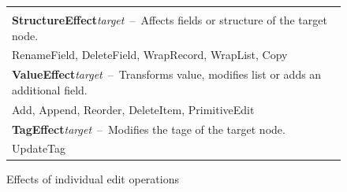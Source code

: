 \documentclass[sigconf,anonymous,screen]{acmart}
\newcommand{\ident}[1]{{\sffamily #1}}
\begin{document}

\begin{figure}
\newcommand{\eftablecol}[3]{
\small{\bfseries #1}\;\footnotesize\textit{target}\,\; --\,\; {\footnotesize #2}\\[-0.1em]
\quad \small #3\\[0.3em]
}
\begin{tabular}{|p{27em}|}
\hline
\\[-1em]
\eftablecol{StructureEffect}{Affects fields or structure of the target node.}
  {\ident{RenameField}, \ident{DeleteField}, \ident{WrapRecord}, \ident{WrapList}, \ident{Copy}}
\eftablecol{ValueEffect}{Transforms value, modifies list or adds an additional field.}
  {\ident{Add}, \ident{Append}, \ident{Reorder}, \ident{DeleteItem}, \ident{PrimitiveEdit}}
\eftablecol{TagEffect}{Modifies the tage of the target node.}
  {\ident{UpdateTag}}
\hline
\end{tabular}
\vspace{-0.5em}
\caption{Effects of individual edit operations}
\label{fig:effects}
\vspace{-1em}
\end{figure}

\end{document}
